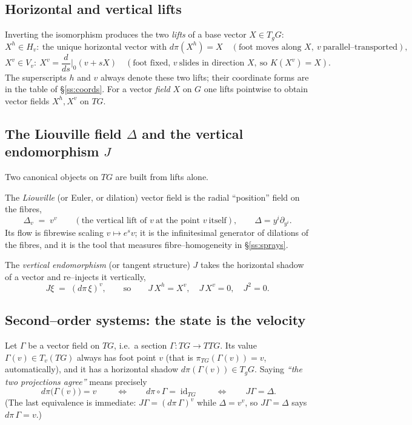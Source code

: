 \documentclass[11pt]{article}
\theoremstyle{definition}
\theoremstyle{plain}
\newcommand{\id}{\operatorname{id}}
\newcommand{\dpi}{d\pi}
\newcommand{\hor}[1]{#1^{h}}
\newcommand{\ver}[1]{#1^{v}}
\newcommand{\TG}{TG}
\newcommand{\TTG}{TTG}
\newcommand{\Liou}{\Delta}
\newcommand{\dd}[1]{\partial_{#1}}
\begin{document}
\subsection{Horizontal and vertical lifts}\label{ss:lifts}

Inverting the isomorphism produces the two \emph{lifts} of a base vector $X\in T_{g}G$:
\[
  \hor{X}\in H_{v}:\ \text{the unique horizontal vector with }\dpi(\hor{X})=X
  \quad(\text{foot moves along }X,\ v\ \text{parallel--transported}),
\]
\[
  \ver{X}\in V_{v}:\ \ver{X}=\frac{d}{ds}\Big|_{0}(v+sX)
  \quad(\text{foot fixed, }v\ \text{slides in direction }X,\ \text{so }K(\ver{X})=X).
\]
The superscripts $h$ and $v$ always denote these two lifts; their coordinate forms are in
the table of \S\ref{ss:coords}. For a vector \emph{field} $X$ on $G$ one lifts pointwise
to obtain vector fields $\hor{X},\ver{X}$ on $\TG$.

\subsection{The Liouville field $\Liou$ and the vertical endomorphism $J$}\label{ss:liouville}

Two canonical objects on $\TG$ are built from lifts alone.

The \emph{Liouville} (or Euler, or dilation) vector field is the radial ``position'' field
on the fibres,
\[
  \Liou_{v}\;=\;\ver{v}
  \qquad(\text{the vertical lift of }v\ \text{at the point }v\ \text{itself}),
  \qquad \Liou=y^{i}\dd{y^{i}} .
\]
Its flow is fibrewise scaling $v\mapsto e^{s}v$; it is the infinitesimal generator of
dilations of the fibres, and it is the tool that measures fibre--homogeneity in
\S\ref{ss:sprays}.

The \emph{vertical endomorphism} (or tangent structure) $J$ takes the horizontal shadow of
a vector and re--injects it vertically,
\[
  J\xi\;=\;\ver{(\dpi\,\xi)},
  \qquad\text{so}\qquad
  J\,\hor{X}=\ver{X},\quad J\,\ver{X}=0,\quad J^{2}=0 .
\]

\subsection{Second--order systems: the state is the velocity}\label{ss:sode}

Let $\Gamma$ be a vector field on $\TG$, i.e.\ a section $\Gamma:\TG\to\TTG$. Its value
$\Gamma(v)\in T_{v}(\TG)$ always has foot point $v$ (that is $\pi_{\TG}(\Gamma(v))=v$,
automatically), and it has a horizontal shadow $\dpi(\Gamma(v))\in T_{g}G$. Saying
\emph{``the two projections agree''} means precisely
\[
  \boxed{\;\dpi\bigl(\Gamma(v)\bigr)=v\;}
  \qquad\Longleftrightarrow\qquad
  \dpi\circ\Gamma=\id_{\TG}
  \qquad\Longleftrightarrow\qquad
  J\Gamma=\Liou .
\]
(The last equivalence is immediate: $J\Gamma=\ver{(\dpi\,\Gamma)}$ while $\Liou=\ver{v}$,
so $J\Gamma=\Liou$ says $\dpi\,\Gamma=v$.)
\end{document}
